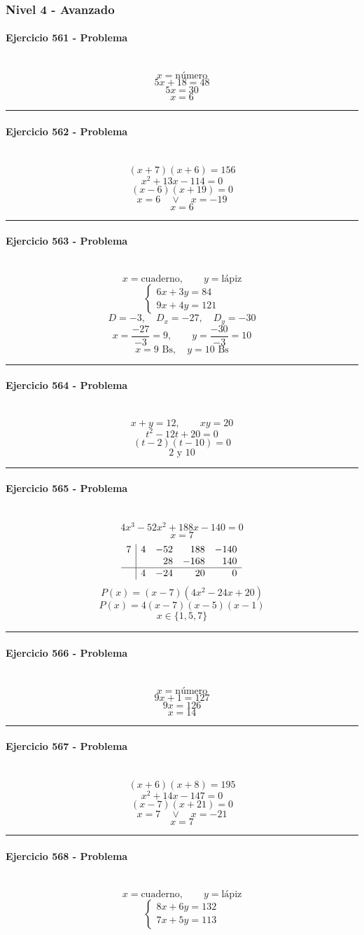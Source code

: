 \documentclass[10pt,a4paper]{article}
\newcommand{\res}[1]{\paragraph{#1}\mbox{}\\[-1.2em]}
\begin{document}
\subsubsection*{Nivel 4 - Avanzado}
\res{Ejercicio 561 - Problema}
\[ x=\text{número} \]
\[ 5x+18=48 \]
\[ 5x=30 \]
\[ \boxed{x=6} \]
\vspace{1mm}\hrule\vspace{2mm}
\res{Ejercicio 562 - Problema}
\[ (x+7)(x+6)=156 \]
\[ x^{2} + 13 x - 114=0 \]
\[ (x-6)(x+19)=0 \]
\[ x=6\quad \vee \quad x=-19 \]
\[ \boxed{x=6} \]
\vspace{1mm}\hrule\vspace{2mm}
\res{Ejercicio 563 - Problema}
\[ x=\text{cuaderno},\qquad y=\text{lápiz} \]
\[ \begin{cases}6x+3y=84\\9x+4y=121\end{cases} \]
\[ D=-3,\quad D_x=-27,\quad D_y=-30 \]
\[ x=\frac{-27}{-3}=9,\qquad y=\frac{-30}{-3}=10 \]
\[ \boxed{x=9\text{ Bs},\quad y=10\text{ Bs}} \]
\vspace{1mm}\hrule\vspace{2mm}
\res{Ejercicio 564 - Problema}
\[ x+y=12,\qquad xy=20 \]
\[ t^2-12t+20=0 \]
\[ (t-2)(t-10)=0 \]
\[ \boxed{2\text{ y }10} \]
\vspace{1mm}\hrule\vspace{2mm}
\res{Ejercicio 565 - Problema}
\[ 4 x^{3} - 52 x^{2} + 188 x - 140=0 \]
\[ x=7 \]
\[\begin{array}{r|rrrr}7 & 4 & -52 & 188 & -140\\  &  & 28 & -168 & 140\\\hline  & 4 & -24 & 20 & 0\end{array}\]
\[ P(x)=(x-7)(4 x^{2} - 24 x + 20) \]
\[ P(x)=4(x-7)(x-5)(x-1) \]
\[ \boxed{x\in\{1,5,7\}} \]
\vspace{1mm}\hrule\vspace{2mm}
\res{Ejercicio 566 - Problema}
\[ x=\text{número} \]
\[ 9x+1=127 \]
\[ 9x=126 \]
\[ \boxed{x=14} \]
\vspace{1mm}\hrule\vspace{2mm}
\res{Ejercicio 567 - Problema}
\[ (x+6)(x+8)=195 \]
\[ x^{2} + 14 x - 147=0 \]
\[ (x-7)(x+21)=0 \]
\[ x=7\quad \vee \quad x=-21 \]
\[ \boxed{x=7} \]
\vspace{1mm}\hrule\vspace{2mm}
\res{Ejercicio 568 - Problema}
\[ x=\text{cuaderno},\qquad y=\text{lápiz} \]
\[ \begin{cases}8x+6y=132\\7x+5y=113\end{cases} \]
\end{document}
